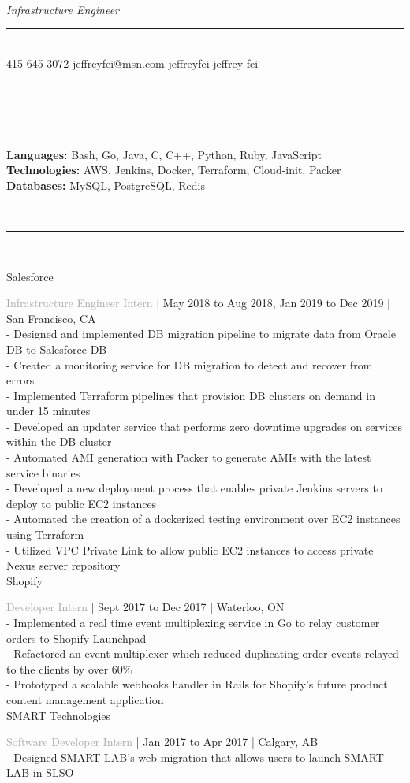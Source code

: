 \documentclass[12pt]{article}
\newcommand{\cvsection}[1]{
    \\[0.2in]
    \indent \fontsize{18}{18}\selectfont{#1}
    \noindent\rule{\textwidth}{1pt}\\[0.1in]
    \fontsize{12}{15}\selectfont
}
\newcommand{\cmpname}[1]{
    \fontsize{15}{15}\selectfont
    \indent #1 \\[0.03in]
    \fontsize{12}{15}\selectfont
}
\newcommand{\position}[3]{
    \fontsize{12}{15}\selectfont
    \indent \textcolor{darkgray}{#1}
    \fontsize{10}{12}\selectfont
    | #2 | #3 \\[0.04in]
}
\newcommand{\secbullet}[1]{
    \fontsize{12}{15}\selectfont
    \indent - #1\\[0.02in]
}
\newcommand{\secendbullet}[1]{
    \fontsize{12}{15}\selectfont
    \indent - #1\\[0.1in]
}
\begin{document}
\fontsize{33}{33}\selectfont{Jeffrey Fei}\\[0.02in]
\indent\fontsize{13}{13}\selectfont \textit{Infrastructure Engineer}
\noindent\rule{\textwidth}{1pt}\\[0.05in]
\fontsize{11}{13}\selectfont
\indent \faPhone\hspace{0.05in} 415-645-3072
\indent \faEnvelope\hspace{0.05in}\href{mailto:jeffreyfei@msn.com}{jeffreyfei@msn.com}
\indent \faGithub\hspace{0.05in}\href{https://github.com/jeffreyfei}{jeffreyfei}
\indent \faLinkedin\hspace{0.05in}\href{https://www.linkedin.com/in/jeffrey-fei/}{jeffrey-fei}
\cvsection{Skills}
\indent \textbf{Languages:} Bash, Go, Java, C, C++, Python, Ruby, JavaScript\\
\indent \textbf{Technologies:} AWS, Jenkins, Docker, Terraform, Cloud-init, Packer\\
\indent \textbf{Databases:} MySQL, PostgreSQL, Redis
\cvsection{Employment}
\cmpname{Salesforce}
\position{Infrastructure Engineer Intern}{May 2018 to Aug 2018, Jan 2019 to Dec 2019}{San Francisco, CA}
\secbullet{Designed and implemented DB migration pipeline to migrate data from Oracle DB to Salesforce DB}
\secbullet{Created a monitoring service for DB migration to detect and recover from errors}
\secbullet{Implemented Terraform pipelines that provision DB clusters on demand in under 15 minutes}
\secbullet{Developed an updater service that performs zero downtime upgrades on services within the DB cluster}
\secbullet{Automated AMI generation with Packer to generate AMIs with the latest service binaries}
\secbullet{Developed a new deployment process that enables private Jenkins servers to deploy to public EC2 instances}
\secbullet{Automated the creation of a dockerized testing environment over EC2 instances using Terraform}
\secendbullet{Utilized VPC Private Link to allow public EC2 instances to access private Nexus server repository}
\cmpname{Shopify}
\position{Developer Intern}{Sept 2017 to Dec 2017}{Waterloo, ON}
\secbullet{Implemented a real time event multiplexing service in Go to relay customer orders to Shopify Launchpad}
\secbullet{Refactored an event multiplexer which reduced duplicating order events relayed to the clients by over 60\%}
\secendbullet{Prototyped a scalable webhooks handler in Rails for Shopify’s future product content management application}
\cmpname{SMART Technologies}
\position{Software Developer Intern}{Jan 2017 to Apr 2017}{Calgary, AB}
\secbullet{Designed SMART LAB's web migration that allows users to launch SMART LAB in SLSO}
\end{document}
